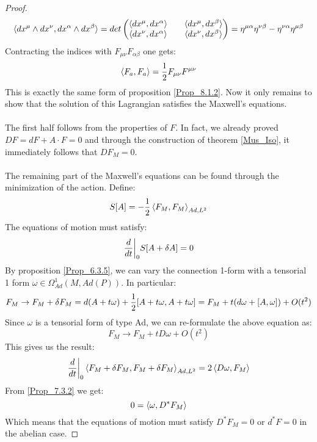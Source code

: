 \documentclass[12pt,a4paper]{report}
\theoremstyle{definition}
\theoremstyle{Theorem}
\theoremstyle{definition}
\theoremstyle{definition}
\begin{document}
\begin{proof}
		$$\braket{dx^\mu\wedge dx^\nu,dx^\alpha\wedge dx^\beta}=det
		\begin{pmatrix}
			\braket{dx^\mu,dx^\alpha} && \braket{dx^\mu,dx^\beta}\\
			\braket{dx^\nu,dx^\alpha} && \braket{dx^\nu,dx^\beta}\\
		\end{pmatrix}=\eta^{\mu\alpha}\eta^{\nu\beta}-\eta^{\nu\alpha}\eta^{\mu\beta}$$
		Contracting the indices with $F_{\mu\nu}F_{\alpha\beta}$ one gets:
		$$\braket{F_a,F_a}={1\over 2}F_{\mu\nu} F^{\mu\nu}$$
		This is exactly the same form of proposition \ref{Prop_8.1.2}. Now it only remains to show that the solution of this Lagrangian satisfies the Maxwell's equations. \\\\
		The first half follows from the properties of $F$. In fact, we already proved $DF=dF+A\cdot F=0$ and through the construction of theorem \ref{Mus_Iso}, it immediately follows that $DF_M=0$.\\
		\\
		The remaining part of the Maxwell's equations can be found through the minimization of the action. Define:
		$$S[A]=-{1\over 2}\braket{F_M,F_M}_{Ad,L^2}$$
 		The equations of motion must satisfy:
 		$${d\over dt}\bigg|_0S[A+\delta A]=0$$
 		By proposition \ref{Prop_6.3.5}, we can vary the connection 1-form with a tensorial 1 form $\omega\in\Omega^1_{Ad}(M,Ad(P))$. In particular:
 		$$F_M\rightarrow F_M+\delta F_M= d(A+t\omega)+{1\over 2}[A+t\omega,A+t\omega]=F_M+t(d\omega+[A,\omega])+O(t^2)$$
 		Since $\omega$ is a tensorial form of type Ad, we can re-formulate the above equation as:
 		$$F_M\rightarrow F_M+tD\omega+O(t^2)$$
 		This gives us the result:
 		$${d\over dt}\bigg|_0\braket{F_M+\delta F_M,F_M+\delta F_M}_{Ad,L^2}=2\braket{D\omega,F_M}$$
 		From \ref{Prop_7.3.2} we get:
 		$$0=\braket{\omega,D^*F_M}$$
 		Which means that the equations of motion must satisfy $D^*F_M=0$ or $d^*F=0$ in the abelian case.
	\end{proof}
\end{document}
